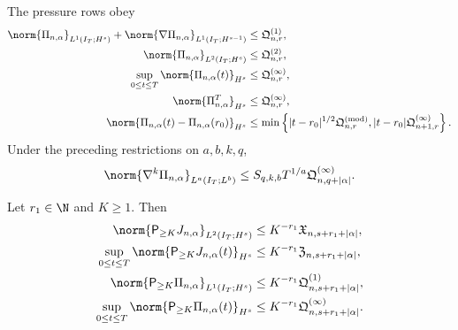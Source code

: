 {\begin{theorem}
The pressure rows obey
\begin{align}
 \norm{\Pi_{n,\alpha}}_{L^1(I_T;H^s)}
 +\norm{\nabla\Pi_{n,\alpha}}_{L^1(I_T;H^{s-1})}
 &\le\mathfrak Q^{(1)}_{n,r},
 \label{eq:qc-sharp-pressure-L1}\\
 \norm{\Pi_{n,\alpha}}_{L^2(I_T;H^s)}
 &\le\mathfrak Q^{(2)}_{n,r},
 \label{eq:qc-sharp-pressure-L2}\\
 \sup_{0\le t\le T}\norm{\Pi_{n,\alpha}(t)}_{H^s}
 &\le\mathfrak Q^{(\infty)}_{n,r},
 \label{eq:qc-sharp-pressure-sup}\\
 \norm{\Pi_{n,\alpha}^T}_{H^s}
 &\le\mathfrak Q^{(\infty)}_{n,r},
 \label{eq:qc-sharp-pressure-endpoint}\\
 \norm{\Pi_{n,\alpha}(t)-\Pi_{n,\alpha}(r_0)}_{H^s}
 &\le\min\left\{
 |t-r_0|^{1/2}\mathfrak Q^{(\mathrm{mod})}_{n,r},
 |t-r_0|\mathfrak Q^{(\infty)}_{n+1,r}
 \right\}.
 \label{eq:qc-sharp-pressure-modulus}
\end{align}
Under the preceding restrictions on \(a,b,k,q\),
\begin{equation}
 \norm{\nabla^k\Pi_{n,\alpha}}_{L^a(I_T;L^b)}
 \le S_{q,k,b}T^{1/a}
 \mathfrak Q^{(\infty)}_{n,q+|\alpha|}.
 \label{eq:qc-sharp-pressure-Lab}
\end{equation}

Let \(r_1\in\N\) and \(K\ge1\).  Then
\begin{align}
 \norm{\mathsf P_{\ge K}J_{n,\alpha}}_{L^2(I_T;H^s)}
 &\le K^{-r_1}\mathfrak X_{n,s+r_1+|\alpha|},
 \label{eq:qc-sharp-velocity-tail-L2}\\
 \sup_{0\le t\le T}
 \norm{\mathsf P_{\ge K}J_{n,\alpha}(t)}_{H^s}
 &\le K^{-r_1}\mathfrak Z_{n,s+r_1+|\alpha|},
 \label{eq:qc-sharp-velocity-tail-sup}\\
 \norm{\mathsf P_{\ge K}\Pi_{n,\alpha}}_{L^1(I_T;H^s)}
 &\le K^{-r_1}\mathfrak Q^{(1)}_{n,s+r_1+|\alpha|},
 \label{eq:qc-sharp-pressure-tail-L1}\\
 \sup_{0\le t\le T}
 \norm{\mathsf P_{\ge K}\Pi_{n,\alpha}(t)}_{H^s}
 &\le K^{-r_1}\mathfrak Q^{(\infty)}_{n,s+r_1+|\alpha|}.
 \label{eq:qc-sharp-pressure-tail-sup}
\end{align}


\end{theorem}}
